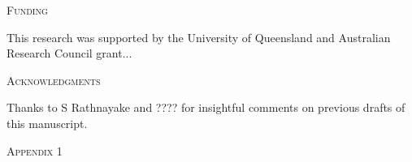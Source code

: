 \documentclass[a4paper]{article}
\renewcommand{\section}[1]{%
\bigskip
\begin{center}
\begin{Large}
\normalfont\scshape #1
\medskip
\end{Large}
\end{center}}
\begin{document}
\section{Funding}
This research was supported by the University of Queensland and Australian Research Council grant...

\section{Acknowledgments}
Thanks to S Rathnayake and ???? for insightful comments on previous drafts of this manuscript.

\renewcommand{\refname}{
\bigskip
\begin{center}
\begin{Large}
\normalfont\scshape References
\medskip
\end{Large}
\end{center}
}




\appendix
\renewcommand{\theequation}{A1.\arabic{equation}}
\setcounter{equation}{0}
\section{Appendix 1}
\end{document}
